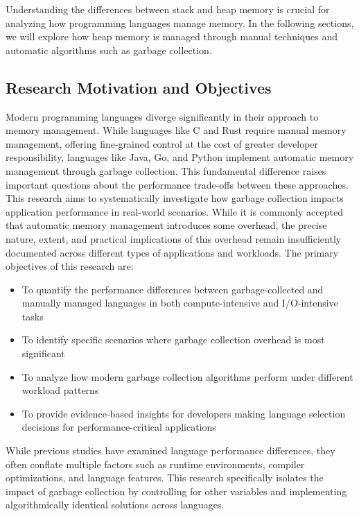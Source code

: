 Understanding the differences between stack and heap memory is crucial for analyzing how programming languages manage memory. In the following sections, we will explore how heap memory is managed through manual techniques and automatic algorithms such as garbage collection.

\subsection{Research Motivation and Objectives}

Modern programming languages diverge significantly in their approach to memory management. While languages like C and Rust require manual memory management, offering fine-grained control at the cost of greater developer responsibility, languages like Java, Go, and Python implement automatic memory management through garbage collection. This fundamental difference raises important questions about the performance trade-offs between these approaches. This research aims to systematically investigate how garbage collection impacts application performance in real-world scenarios. While it is commonly accepted that automatic memory management introduces some overhead, the precise nature, extent, and practical implications of this overhead remain insufficiently documented across different types of applications and workloads. The primary objectives of this research are:

\begin{itemize}
    \item To quantify the performance differences between garbage-collected and manually managed languages in both compute-intensive and I/O-intensive tasks 
    \item To identify specific scenarios where garbage collection overhead is most significant 
    \item To analyze how modern garbage collection algorithms perform under different workload patterns 
    \item To provide evidence-based insights for developers making language selection decisions for performance-critical applications 
\end{itemize}

While previous studies have examined language performance differences, they often conflate multiple factors such as runtime environments, compiler optimizations, and language features. This research specifically isolates the impact of garbage collection by controlling for other variables and implementing algorithmically identical solutions across languages.
